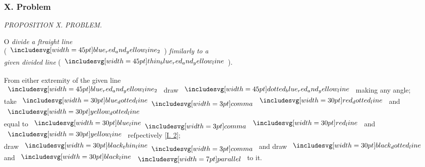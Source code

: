 \documentclass[11pt,preview]{standalone}
\begin{document}
\subsubsection{X. Problem}

\begin{minipage}[t]{0.43\textwidth}
    \vspace{20pt}
    
\end{minipage}%
\hfill
\begin{minipage}[t]{0.54\textwidth}
    \begin{center}
        \textit{PROPOSITION X. PROBLEM.}\label{book6pr10} \\
    \end{center}

    \hfill

    \begin{center}
        \raggedright \lettrine[lines=3, loversize=1, nindent=0pt]{}{}O \textit{divide a ſtraight line}\\ (\hspace{-1ex}$\bimg{blue_red_and_yellow_line_2}$\hspace{-1ex}) \textit{ſimilarly to a\\ given divided line} (\hspace{-1ex}$\bimg{thin_blue_red_and_yellow_line}$\hspace{-1ex}).
    \end{center}
\end{minipage}

\hfill

\begin{center}
    From either extremity of the given line\\
    $\bimg{blue_red_and_yellow_line_2}$ draw $\bimg{dotted_blue_red_and_yellow_line}$ making any angle;\\
    take $\dottedblueline \bcomma \dottedredline$ and $\dottedyellowline$\\
    equal to $\blueline \bcomma \redline$ and $\yellowline$ reſpectively [\hyperref[book1pr2]{\textsc{I.} 2}];\\
    draw $\blackthinline \bcomma$ and draw $\dottedblackline$ and $\blackline \bparallel$ to it.
\end{center}

\hfill
\end{document}
